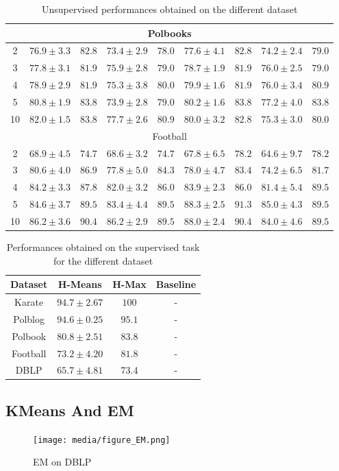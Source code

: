\documentclass{article}
\begin{document}
\begin{table}
\begin{tabular}{|c|cccc|cccc|}
        \hline
        \multicolumn{9}{|c|}{Polbooks} \\ 
        \hline
		2&$76.9 \pm 3.3$&$82.8$&$73.4 \pm 2.9$&$78.0$&$77.6 \pm 4.1$&$82.8$&$74.2 \pm2.4$&$79.0$\\ \hline
		3&$77.8 \pm 3.1$&$81.9$&$75.9 \pm 2.8$&$79.0$&$78.7 \pm 1.9$&$81.9$&$76.0 \pm2.5$&$79.0$\\ \hline
		4&$78.9 \pm 2.9$&$81.9$&$75.3 \pm 3.8$&$80.0$&$79.9 \pm 1.6$&$81.9$&$76.0 \pm3.4$&$80.9$\\ \hline
		5&$80.8 \pm 1.9$&$83.8$&$73.9 \pm 2.8$&$79.0$&$80.2 \pm 1.6$&$83.8$&$77.2 \pm4.0$&$83.8$\\ \hline
		10&$82.0 \pm 1.5$&$83.8$&$77.7 \pm 2.6$&$80.9$&$80.0 \pm 3.2$&$82.8$&$75.3 \pm3.0$&$80.0$\\ \hline

        \hline
        \multicolumn{9}{|c|}{Football} \\
        \hline
        2&$68.9 \pm 4.5$&$74.7$&$68.6 \pm 3.2$&$74.7$&$67.8 \pm 6.5$&$78.2$&$64.6 \pm9.7$&$78.2$\\ \hline
        3&$80.6 \pm 4.0$&$86.9$&$77.8 \pm 5.0$&$84.3$&$78.0 \pm 4.7$&$83.4$&$74.2 \pm6.5$&$81.7$\\ \hline
        4&$84.2 \pm 3.3$&$87.8$&$82.0 \pm 3.2$&$86.0$&$83.9 \pm 2.3$&$86.0$&$81.4 \pm5.4$&$89.5$\\ \hline
        5&$84.6 \pm 3.7$&$89.5$&$83.4 \pm 4.4$&$89.5$&$88.3 \pm 2.5$&$91.3$&$85.0 \pm4.3$&$89.5$\\ \hline
        10&$86.2 \pm 3.6$&$90.4$&$86.2 \pm 2.9$&$89.5$&$88.0 \pm 2.4$&$90.4$&$84.0 \pm4.6$&$89.5$\\ \hline


  \end{tabular}
  \caption{Unsupervised performances obtained on the different dataset}
\end{table}

\begin{table}
    \begin{tabular}{|c|cc|c|}
        \hline
        Dataset & H-Means & H-Max & Baseline \\
        \hline
        Karate & $94.7\pm2.67$ & $100$ & - \\
        Polblog & $94.6\pm0.25$ & $95.1$ & - \\
        Polbook & $80.8 \pm 2.51$ & $83.8$ & - \\
        Football & $73.2 \pm 4.20$ & $81.8$ & - \\
        DBLP & $65.7\pm4.81$& $73.4$ & - \\

        \hline
    \end{tabular}
    \centering
    \caption{Performances obtained on the supervised task for the different dataset}
\end{table}

\subsection{KMeans And EM}
\begin{figure}[!ht]
    \centering
    \texttt{[image: media/figure\_EM.png]}
    \caption{EM on DBLP}
    \label{fig:embedding}
\end{figure}
\end{document}
